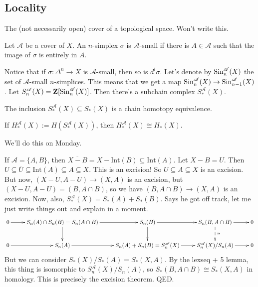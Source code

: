 \subsection{Locality}
\begin{definition}
The (not necessarily open) cover of a topological space. Won't write this.
\end{definition}
\begin{definition}
Let ${\mathscr{A}}$ be a cover of $X$. An $n$-simplex $\sigma$ is ${\mathscr{A}}$-small if there is $A\in \mathscr{A}$ such that the image of $\sigma$ is entirely in $A$.
\end{definition}
Notice that if $\sigma:\Delta^n\to X$ is ${\mathscr{A}}$-small, then so is $d^i\sigma$. Let's denote by $\mathrm{Sin}^{\mathscr{A}}_n(X)$ the set of ${\mathscr{A}}$-small $n$-simplices. This means that we get a map $\mathrm{Sin}^{\mathscr{A}}_n(X)\to \mathrm{Sin}^{\mathscr{A}}_{n-1}(X)$. Let $S^{\mathscr{A}}_n(X)=\mathbf Z[\mathrm{Sin}^{\mathscr{A}}_n(X)]$. Then there's a subchain complex $S^{\mathscr{A}}_\ast(X)$.
\begin{theorem}
The inclusion $S^\mathscr{A}_\ast(X)\subseteq S_\ast(X)$ is a chain homotopy equivalence.
\end{theorem}
\begin{corollary}
If $ H^\mathscr{A}_\ast(X):= H(S^\mathscr{A}_\ast(X))$, then $ H^\mathscr{A}_\ast(X)\cong H_\ast(X)$.
\end{corollary}
We'll do this on Monday.
\begin{example}
If $\mathscr{A}=\{A,B\}$, then $\overline{X-B}=X-\mathrm{Int}(B)\subseteq\mathrm{Int}(A)$. Let $X-B=U$. Then $U\subseteq \overline{U}\subseteq \mathrm{Int}(A)\subseteq A\subseteq X$. This is an excision! So $U\subseteq A\subseteq X$ is an excision. But now, $(X-U,A-U)\to (X,A)$ is an excision, but $(X-U,A-U)=(B,A\cap B)$, so we have $(B,A\cap B)\to (X,A)$ is an excision. Now, also, $S^\mathscr{A}_\ast(X)=S_\ast(A)+S_\ast(B)$. Says he got off track, let me just write things out and explain in a moment.
\begin{equation*}
	\xymatrix{0\ar[r] & S_n(A)\cap S_n(B)=S_n(A\cap B)\ar[r]\ar[d] & S_n(B)\ar[r]\ar[d] & S_n(B,A\cap B)\ar[r]\ar@{-->}[d]^\cong & 0\\
	0\ar[r] & S_n(A)\ar[r] & S_n(A)+S_n(B)=S^\mathscr{A}_n(X)\ar[r] & S^\mathscr{A}_n(X)/S_n(A)\ar[r] & 0}
	\end{equation*}
But we can consider $S_\ast(X)/S_\ast(A)=S_\ast(X,A)$. By the lexseq + 5 lemma, this thing is isomorphic to $S^\mathscr{A}_n(X)/S_n(A)$, so $S_\ast(B,A\cap B)\cong S_\ast(X,A)$ in homology. This is precisely the excision theorem. QED.
\end{example}
